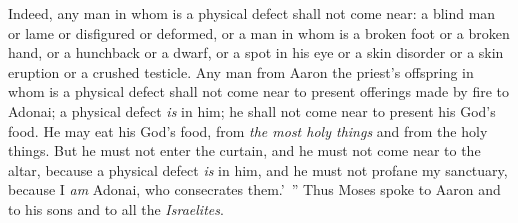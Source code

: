 \begin{biblechapter}
\verse Indeed, any man in whom is a physical defect shall not come near: a blind man or lame or disfigured or deformed,
\verse or a man in whom is a broken foot or a broken hand,
\verse or a hunchback or a dwarf, or a spot in his eye or a skin disorder or a skin eruption or a crushed testicle.
\verse Any man from Aaron the priest’s offspring in whom is a physical defect shall not come near to present offerings made by fire to Adonai; a physical defect \textit{is} in him; he shall not come near to present his God’s food.
\verse He may eat his God’s food, from \textit{the most holy things} and from the holy things.
\verse But he must not enter the curtain, and he must not come near to the altar, because a physical defect \textit{is} in him, and he must not profane my sanctuary, because I \textit{am} Adonai, who consecrates them.’ ”
\verse Thus Moses spoke to Aaron and to his sons and to all the \textit{Israelites}.
\end{biblechapter}

